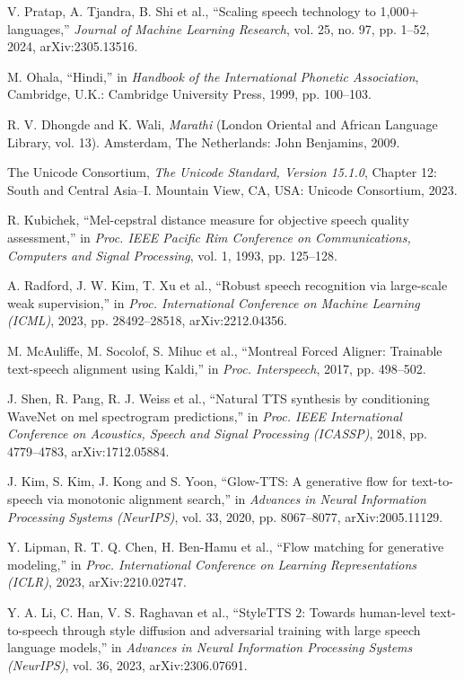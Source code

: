 \documentclass[12pt,a4paper]{article}
\begin{document}
\begin{singlespace}
\begin{enumerate}[label={[\arabic*]},leftmargin=2.3em,itemsep=3pt,topsep=4pt]
  \item V. Pratap, A. Tjandra, B. Shi et al., “Scaling speech technology to 1,000+ languages,” \textit{Journal of Machine Learning Research}, vol. 25, no. 97, pp. 1–52, 2024, arXiv:2305.13516.
  \item M. Ohala, “Hindi,” in \textit{Handbook of the International Phonetic Association}, Cambridge, U.K.: Cambridge University Press, 1999, pp. 100–103.
  \item R. V. Dhongde and K. Wali, \textit{Marathi} (London Oriental and African Language Library, vol. 13). Amsterdam, The Netherlands: John Benjamins, 2009.
  \item The Unicode Consortium, \textit{The Unicode Standard, Version 15.1.0}, Chapter 12: South and Central Asia–I. Mountain View, CA, USA: Unicode Consortium, 2023.
  \item R. Kubichek, “Mel-cepstral distance measure for objective speech quality assessment,” in \textit{Proc. IEEE Pacific Rim Conference on Communications, Computers and Signal Processing}, vol. 1, 1993, pp. 125–128.
  \item A. Radford, J. W. Kim, T. Xu et al., “Robust speech recognition via large-scale weak supervision,” in \textit{Proc. International Conference on Machine Learning (ICML)}, 2023, pp. 28492–28518, arXiv:2212.04356.
  \item M. McAuliffe, M. Socolof, S. Mihuc et al., “Montreal Forced Aligner: Trainable text-speech alignment using Kaldi,” in \textit{Proc. Interspeech}, 2017, pp. 498–502.
  \item J. Shen, R. Pang, R. J. Weiss et al., “Natural TTS synthesis by conditioning WaveNet on mel spectrogram predictions,” in \textit{Proc. IEEE International Conference on Acoustics, Speech and Signal Processing (ICASSP)}, 2018, pp. 4779–4783, arXiv:1712.05884.
  \item J. Kim, S. Kim, J. Kong and S. Yoon, “Glow-TTS: A generative flow for text-to-speech via monotonic alignment search,” in \textit{Advances in Neural Information Processing Systems (NeurIPS)}, vol. 33, 2020, pp. 8067–8077, arXiv:2005.11129.
  \item Y. Lipman, R. T. Q. Chen, H. Ben-Hamu et al., “Flow matching for generative modeling,” in \textit{Proc. International Conference on Learning Representations (ICLR)}, 2023, arXiv:2210.02747.
  \item Y. A. Li, C. Han, V. S. Raghavan et al., “StyleTTS 2: Towards human-level text-to-speech through style diffusion and adversarial training with large speech language models,” in \textit{Advances in Neural Information Processing Systems (NeurIPS)}, vol. 36, 2023, arXiv:2306.07691.

\end{enumerate}
\end{singlespace}
\end{document}
